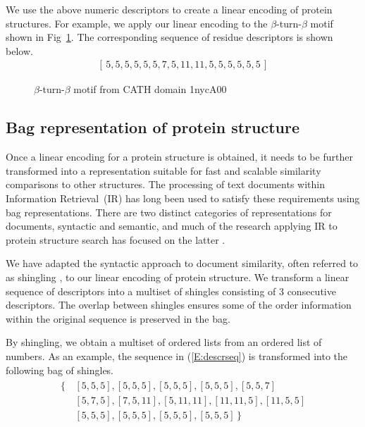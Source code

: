\documentclass[10pt,letterpaper]{article}
\renewcommand{\figurename}{Fig}
\begin{document}
We use the above numeric descriptors to create a linear encoding of protein structures. 
For example, we apply our linear encoding to the $\beta$-turn-$\beta$ motif shown in \figurename~\ref{fig:beta_turn}.
The corresponding sequence of residue descriptors is shown below.
\begin{gather}\label{E:descrseq} 
    [\, 5, 5, 5, 5, 5, 5, 7, 5, 11, 11, 5, 5, 5, 5, 5, 5 \,]
\end{gather}

\begin{figure}[!h]
\caption{$\beta$-turn-$\beta$ motif from CATH domain 1nycA00}
\label{fig:beta_turn}
\end{figure}

\subsection*{Bag representation of protein structure}

Once a linear encoding for a protein structure is obtained, it needs to be further transformed into a representation suitable for fast and scalable similarity comparisons to other structures.
The processing of text documents within Information Retrieval~(IR) has long been used to satisfy these requirements using bag representations.
There are two distinct categories of representations for documents, syntactic and semantic, and much of the research applying IR to protein structure search has focused on the latter \cite{Aungand2004,Zhang2010,Budowski2010}. 

We have adapted the syntactic approach to document similarity, often referred to as shingling \cite{Broder1997a}, to our linear encoding of protein structure. 
We transform a linear sequence of descriptors into a multiset of shingles consisting of 3 consecutive descriptors.
The overlap between shingles ensures some of the order information within the original sequence is preserved in the bag. 

By shingling, we obtain a multiset of ordered lists from an ordered list of numbers. 
As an example, the sequence in (\ref{E:descrseq}) is transformed into the following bag of shingles. 
\begin{align}\label{E:shinglebag}
    \begin{split}
        \{\,&[5, 5, 5], [5, 5, 5], [5, 5, 5], [5, 5, 5], [5, 5, 7] \\
            & [5, 7, 5], [7, 5, 11], [5, 11, 11], [11, 11, 5], [11, 5, 5] \\
            & [5, 5, 5], [5, 5, 5], [5, 5, 5], [5, 5, 5] \,\}
    \end{split}
\end{align}
\end{document}

